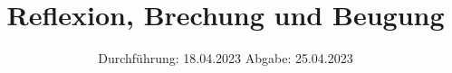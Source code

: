 

\subject{VERSUCH NUMMER 400}
\title{Reflexion, Brechung und Beugung}
\date{
  Durchführung: 18.04.2023
  \hspace{3em}
  Abgabe: 25.04.2023
}



\maketitle
\thispagestyle{empty}
\tableofcontents
\newpage
\setcounter{page}{1}







\newpage
\printbibliography
\nocite{ap308}
\nocite{matplotlib}
\nocite{numpy}
\nocite{scipy}
\nocite{uncertainties}
\nocite{reback2020pandas}

\newpage
%
%
%


